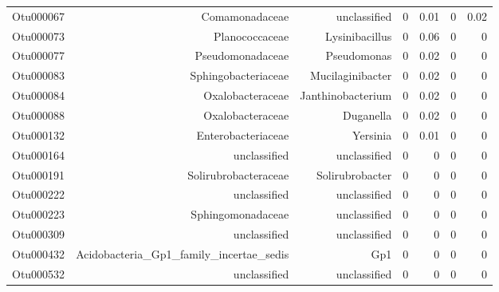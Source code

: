 \begin{table}[ht]
\begin{tabular}{crrrrrr}
  Otu000067 & Comamonadaceae & unclassified & 0 & 0.01 & 0 & 0.02 \\ 
  Otu000073 & Planococcaceae & Lysinibacillus & 0 & 0.06 & 0 & 0 \\ 
  Otu000077 & Pseudomonadaceae & Pseudomonas & 0 & 0.02 & 0 & 0 \\ 
  Otu000083 & Sphingobacteriaceae & Mucilaginibacter & 0 & 0.02 & 0 & 0 \\ 
  Otu000084 & Oxalobacteraceae & Janthinobacterium & 0 & 0.02 & 0 & 0 \\ 
  Otu000088 & Oxalobacteraceae & Duganella & 0 & 0.02 & 0 & 0 \\ 
  Otu000132 & Enterobacteriaceae & Yersinia & 0 & 0.01 & 0 & 0 \\ 
  Otu000164 & unclassified & unclassified & 0 & 0 & 0 & 0 \\ 
  Otu000191 & Solirubrobacteraceae & Solirubrobacter & 0 & 0 & 0 & 0 \\ 
  Otu000222 & unclassified & unclassified & 0 & 0 & 0 & 0 \\ 
  Otu000223 & Sphingomonadaceae & unclassified & 0 & 0 & 0 & 0 \\ 
  Otu000309 & unclassified & unclassified & 0 & 0 & 0 & 0 \\ 
  Otu000432 & Acidobacteria\_Gp1\_family\_incertae\_sedis & Gp1 & 0 & 0 & 0 & 0 \\ 
  Otu000532 & unclassified & unclassified & 0 & 0 & 0 & 0 \\ 
   \hline
\end{tabular}
\end{table}
